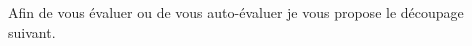 %

Afin de vous évaluer ou de vous auto-évaluer je vous propose le découpage suivant.

\begin{multicols}{2}
\allCompWideMP
\end{multicols}